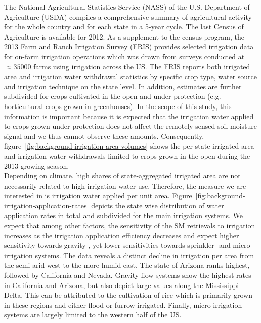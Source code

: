 \documentclass[hess, manuscript]{copernicus}
\begin{document}
The National Agricultural Statistics Service (NASS) of the U.S. Department of Agriculture (USDA) compiles a comprehensive summary of agricultural activity for the whole country and for each state in a 5-year cycle. The last \glqq Census of Agriculture\grqq \citep{nass2012census} is available for 2012. As a supplement to the census program, the 2013 Farm and Ranch Irrigation Survey (FRIS) \citep{fris2013} provides selected irrigation data for on-farm irrigation operations which was drawn from surveys conducted at $\approx 35000$ farms using irrigation across the US. The FRIS reports both irrigated area and irrigation water withdrawal statistics by specific crop type, water source and irrigation technique on the state level. In addition, estimates are further subdivided for crops cultivated in the open and under protection (e.g. horticultural crops grown in greenhouses). In the scope of this study, this information is important because it is expected that the irrigation water applied to crops grown under protection does not affect the remotely sensed soil moisture signal and we thus cannot observe these amounts. Consequently, figure~\ref{fig:background-irrigation-area-volumes} shows the per state irrigated area and irrigation water withdrawals limited to crops grown in the open during the 2013 growing season.\\ 

Depending on climate, high shares of  state-aggregated irrigated area are not necessarily related to high irrigation water use. Therefore, the measure we are interested in is irrigation water applied per unit area. Figure~\ref{fig:background-irrigation-application-rates} depicts the state wise distribution of water application rates in total and subdivided for the main irrigation systems. We expect that among other factors, the sensitivity of the SM retrievals to irrigation increases as the irrigation application efficiency decreases and expect higher sensitivity towards gravity-, yet lower sensitivities towards sprinkler- and micro-irrigation systems. The data reveals a distinct decline in irrigation per area from the semi-arid west to the more humid east. The state of Arizona ranks highest, followed by California and Nevada. Gravity flow systems show the highest rates in California and Arizona, but also depict large values along the Mississippi Delta. This can be attributed to the cultivation of rice which is primarily grown in these regions and either flood or furrow irrigated. Finally, micro-irrigation systems are largely limited to the western half of the US.
\end{document}
